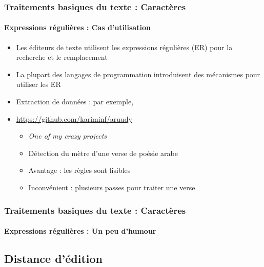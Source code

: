 \documentclass[xcolor=table]{beamer}
\begin{document}
\begin{frame}
\frametitle{Traitements basiques du texte : Caractères}
\framesubtitle{Expressions régulières : Cas d'utilisation}

\begin{itemize}
	\item Les éditeurs de texte utilisent les expressions régulières (ER) pour la recherche et le remplacement
	\item La plupart des langages de programmation introduisent des mécanismes pour utiliser les ER
	\item Extraction de données : par exemple, 
	\item \url{https://github.com/kariminf/aruudy}
	\begin{itemize}
		\item \textit{One of my crazy projects}
		\item Détection du mètre d'une verse de poésie arabe
		\item Avantage : les règles sont lisibles
		\item Inconvénient : plusieurs passes pour traiter une verse 
	\end{itemize}
\end{itemize}

\end{frame}

\begin{frame}
\frametitle{Traitements basiques du texte : Caractères}
\framesubtitle{Expressions régulières : Un peu d'humour}

\begin{center}
\end{center}

\end{frame}

\subsection{Distance d'édition}
\end{document}
